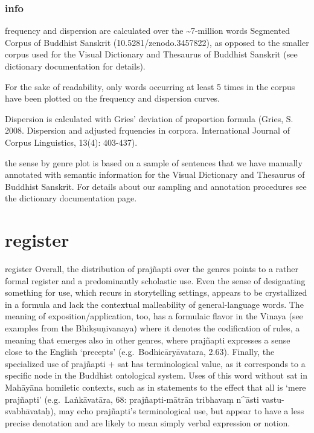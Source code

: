 \documentclass[
  letterpaper,
  DIV=11,
  numbers=noendperiod,
  oneside]{scrreprt}
\begin{document}
\hypertarget{sec-disperioninfo}{%
\subsubsection{info}\label{sec-disperioninfo}}

frequency and dispersion are calculated over the
\textasciitilde7-million words Segmented Corpus of Buddhist Sanskrit
(10.5281/zenodo.3457822), as opposed to the smaller corpus used for the
Visual Dictionary and Thesaurus of Buddhist Sanskrit (see dictionary
documentation for details).

For the sake of readability, only words occurring at least 5 times in
the corpus have been plotted on the frequency and dispersion curves.

Dispersion is calculated with Gries' deviation of proportion formula
(Gries, S. 2008. Dispersion and adjusted frquencies in corpora.
International Journal of Corpus Linguistics, 13(4): 403-437).

the sense by genre plot is based on a sample of sentences that we have
manually annotated with semantic information for the Visual Dictionary
and Thesaurus of Buddhist Sanskrit. For details about our sampling and
annotation procedures see the dictionary documentation page.

\hypertarget{sec-register}{%
\section{register}\label{sec-register}}

register Overall, the distribution of prajñapti over the genres points
to a rather formal register and a predominantly scholastic use. Even the
sense of designating something for use, which recurs in storytelling
settings, appears to be crystallized in a formula and lack the
contextual malleability of general-language words. The meaning of
exposition/application, too, has a formulaic flavor in the Vinaya (see
examples from the Bhikṣuṇivanaya) where it denotes the codification of
rules, a meaning that emerges also in other genres, where prajñapti
expresses a sense close to the English `precepts'
(e.g.~Bodhicāryāvatara, 2.63). Finally, the specialized use of prajñapti
+ sat has terminological value, as it corresponds to a specific node in
the Buddhist ontological system. Uses of this word without sat in
Mahāyāna homiletic contexts, such as in statements to the effect that
all is `mere prajñapti' (e.g.~Laṅkāvatāra, 68: prajñapti-mātrān
tribhavaṃ n\^{}āsti vastu-svabhāvataḥ), may echo prajñapti's
terminological use, but appear to have a less precise denotation and are
likely to mean simply verbal expression or notion.
\end{document}
